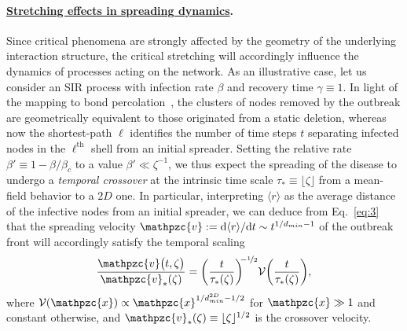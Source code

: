 \documentclass[aps, groupedaddress, superscriptaddress, prl, reprint]{revtex4-1}
\begin{document}
\paragraph*{\underline{Stretching effects in spreading dynamics}.} 
$\!\!\!\!$Since critical phenomena are strongly affected by the geometry of the underlying interaction structure, the critical stretching will accordingly influence the dynamics of processes acting on the network.
As an illustrative case, let us consider an SIR process with infection rate $\beta$ and recovery time $\gamma\equiv1$. %
In light of the mapping to bond percolation~\cite{epidemics}, the clusters of nodes removed by the outbreak are geometrically equivalent to those originated from a static deletion, whereas now the shortest-path $\ell$ identifies the number of time steps $t$ separating infected nodes in the $\ell^\mathrm{th}$ shell from an initial spreader. 
Setting the relative rate $\beta'\equiv1-\beta/\beta_c$ to a value $\beta'\ll\zeta^{-1}$, we thus expect the spreading of the disease to undergo a {\em temporal crossover} at the intrinsic time scale $\tau_*\equiv\lfloor\zeta\rfloor$ from a mean-field behavior to a $2D$ one. 
In particular, interpreting $\langle r\rangle$ as the average distance of the infective nodes from an initial spreader, we can deduce from Eq.~\eqref{eq:3} that the spreading velocity $\mathpzc{v}:=\mathrm{d}\langle r\rangle/\mathrm{d} t\sim t^{1/d_{min}-1}$ of the outbreak front will accordingly satisfy the temporal scaling
\begin{equation}\label{eq:5}
\frac{\mathpzc{v}\big(t,\zeta\big)}{\mathpzc{v}_*(\zeta)}=\bigg(\frac{t}{\tau_*(\zeta)}\bigg)^{\!\!-\nicefrac{1}{2}}
\mathcal{V}\bigg(\frac{t}{\tau_*(\zeta)}\bigg),
\end{equation}
\noindent
where $\mathcal{V}(\mathpzc{x})\propto\mathpzc{x}^{1/d_{min}^{2D}-1/2}$ for $\mathpzc{x}\gg1$ and constant otherwise, and $\mathpzc{v}_*(\zeta)\equiv\lfloor\zeta\rfloor^{1/2}$ is the crossover velocity. 
\end{document}
